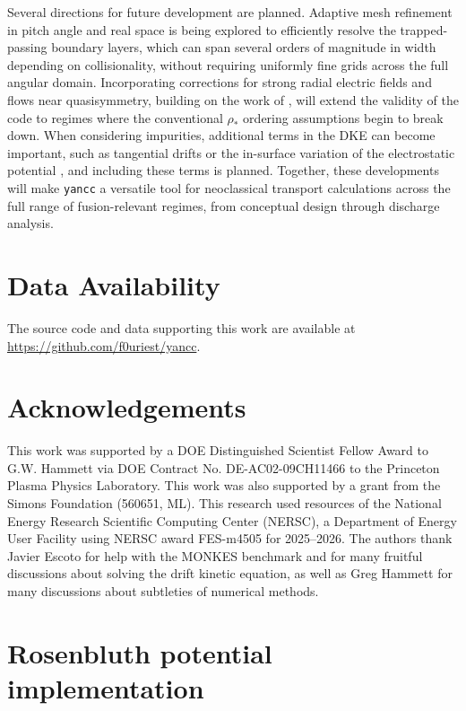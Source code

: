 \documentclass[11pt]{article}
\newcommand{\yancc}{\texttt{yancc}}
\begin{document}
Several directions for future development are planned. Adaptive mesh refinement in
pitch angle and real space is being explored
to efficiently resolve the trapped-passing boundary layers, which can span
several orders of magnitude in width depending on collisionality, without
requiring uniformly fine grids across the full angular domain. Incorporating
corrections for strong radial electric fields and flows near quasisymmetry,
building on the work of \cite{nies_turbulence_2025}, will extend the validity of
the code to regimes
where the conventional $\rho_*$ ordering assumptions begin to break down. When
considering impurities, additional terms in the DKE can become important, such as
tangential drifts or the in-surface variation of the electrostatic potential
\cite{garcia2017electrostatic}, and including these terms is planned.
Together, these developments will make \yancc{} a versatile tool for
neoclassical transport calculations across the full range of fusion-relevant
regimes, from conceptual design through discharge analysis.


\section*{Data Availability}
The source code and data supporting this work are available at
\url{https://github.com/f0uriest/yancc}.

\section*{Acknowledgements}
This work was supported by a DOE Distinguished Scientist Fellow Award to G.W. Hammett
via DOE Contract No. DE-AC02-09CH11466 to the Princeton Plasma Physics Laboratory.
This work was also supported by a grant from the Simons Foundation (560651, ML). This research
used resources of the National Energy Research Scientific Computing Center
(NERSC), a Department of Energy User Facility using NERSC award FES-m4505 for
2025--2026. The authors thank Javier Escoto for help with the MONKES benchmark and
for many fruitful discussions about solving the drift kinetic equation, as well
as Greg Hammett for many discussions about subtleties of numerical methods.

\appendix

\section{Rosenbluth potential implementation}
\label{app:rosenbluth}
\end{document}
